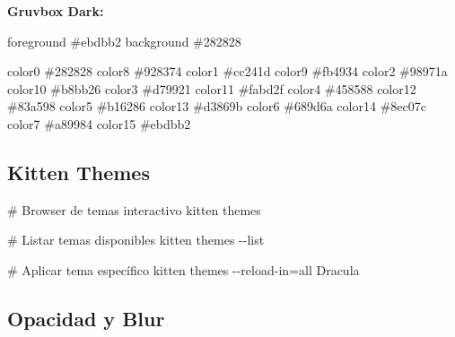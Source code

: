 \documentclass[
  doc,
  floatsintext,
  longtable,
  a4paper,
  nolmodern,
  notxfonts,
  notimes,
  12pt,
  colorlinks=true,linkcolor=blue,citecolor=blue,urlcolor=blue]{apa7}
\newenvironment{Shaded}{\begin{snugshade}}{\end{snugshade}}
\newcommand{\AttributeTok}[1]{\textcolor[rgb]{0.40,0.45,0.13}{#1}}
\newcommand{\CommentTok}[1]{\textcolor[rgb]{0.37,0.37,0.37}{#1}}
\newcommand{\DataTypeTok}[1]{\textcolor[rgb]{0.68,0.00,0.00}{#1}}
\newcommand{\ExtensionTok}[1]{\textcolor[rgb]{0.00,0.23,0.31}{#1}}
\newcommand{\NormalTok}[1]{\textcolor[rgb]{0.00,0.23,0.31}{#1}}
\newcommand{\OperatorTok}[1]{\textcolor[rgb]{0.37,0.37,0.37}{#1}}
\begin{document}
\textbf{Gruvbox Dark:}

\begin{Shaded}
\begin{Highlighting}[]
\DataTypeTok{foreground} \CommentTok{\#ebdbb2}
\DataTypeTok{background} \CommentTok{\#282828}

\DataTypeTok{color0}  \CommentTok{\#282828}
\DataTypeTok{color8}  \CommentTok{\#928374}
\DataTypeTok{color1}  \CommentTok{\#cc241d}
\DataTypeTok{color9}  \CommentTok{\#fb4934}
\DataTypeTok{color2}  \CommentTok{\#98971a}
\DataTypeTok{color10} \CommentTok{\#b8bb26}
\DataTypeTok{color3}  \CommentTok{\#d79921}
\DataTypeTok{color11} \CommentTok{\#fabd2f}
\DataTypeTok{color4}  \CommentTok{\#458588}
\DataTypeTok{color12} \CommentTok{\#83a598}
\DataTypeTok{color5}  \CommentTok{\#b16286}
\DataTypeTok{color13} \CommentTok{\#d3869b}
\DataTypeTok{color6}  \CommentTok{\#689d6a}
\DataTypeTok{color14} \CommentTok{\#8ec07c}
\DataTypeTok{color7}  \CommentTok{\#a89984}
\DataTypeTok{color15} \CommentTok{\#ebdbb2}
\end{Highlighting}
\end{Shaded}

\subsection{Kitten Themes}\label{kitten-themes}

\begin{Shaded}
\begin{Highlighting}[]
\CommentTok{\# Browser de temas interactivo}
\ExtensionTok{kitten}\NormalTok{ themes}

\CommentTok{\# Listar temas disponibles}
\ExtensionTok{kitten}\NormalTok{ themes }\AttributeTok{{-}{-}list}

\CommentTok{\# Aplicar tema específico}
\ExtensionTok{kitten}\NormalTok{ themes }\AttributeTok{{-}{-}reload{-}in}\OperatorTok{=}\NormalTok{all Dracula}
\end{Highlighting}
\end{Shaded}

\subsection{Opacidad y Blur}\label{opacidad-y-blur}
\end{document}
